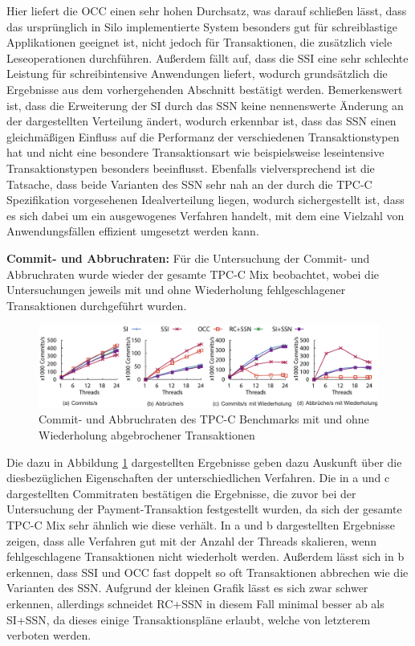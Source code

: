 Hier liefert die OCC einen sehr hohen Durchsatz, was darauf schließen lässt, dass das ursprünglich in Silo implementierte System besonders gut für schreiblastige Applikationen geeignet ist, nicht jedoch für Transaktionen, die zusätzlich viele Leseoperationen durchführen.
Außerdem fällt auf, dass die SSI eine sehr schlechte Leistung für schreibintensive Anwendungen liefert, wodurch grundsätzlich die Ergebnisse aus dem vorhergehenden Abschnitt bestätigt werden.
Bemerkenswert ist, dass die Erweiterung der SI durch das SSN keine nennenswerte Änderung an der dargestellten Verteilung ändert, wodurch erkennbar ist, dass das SSN einen gleichmäßigen Einfluss auf die Performanz der verschiedenen Transaktionstypen hat und nicht eine besondere Transaktionsart wie beispielsweise leseintensive Transaktionstypen besonders beeinflusst.
Ebenfalls vielversprechend ist die Tatsache, dass beide Varianten des SSN sehr nah an der durch die TPC-C Spezifikation vorgesehenen Idealverteilung liegen, wodurch sichergestellt ist, dass es sich dabei um ein ausgewogenes Verfahren handelt, mit dem eine Vielzahl von Anwendungsfällen effizient umgesetzt werden kann.

\textbf{Commit- und Abbruchraten:} Für die Untersuchung der Commit- und Abbruchraten wurde wieder der gesamte TPC-C Mix beobachtet, wobei die Untersuchungen jeweils mit und ohne Wiederholung fehlgeschlagener Transaktionen durchgeführt wurden.

\begin{figure}
	\includegraphics[width=\textwidth]{img/Figure_5_original.pdf}
	\caption{Commit- und Abbruchraten des TPC-C Benchmarks mit und ohne Wiederholung abgebrochener Transaktionen}
	\label{fig:commit_abort}
\end{figure}

Die dazu in Abbildung \ref{fig:commit_abort} dargestellten Ergebnisse geben dazu Auskunft über die diesbezüglichen Eigenschaften der unterschiedlichen Verfahren.
Die in a und c dargestellten Commitraten bestätigen die Ergebnisse, die zuvor bei der Untersuchung der Payment-Transaktion festgestellt wurden, da sich der gesamte TPC-C Mix sehr ähnlich wie diese verhält.
In a und b dargestellten Ergebnisse zeigen, dass alle Verfahren gut mit der Anzahl der Threads skalieren, wenn fehlgeschlagene Transaktionen nicht wiederholt werden.
Außerdem lässt sich in b erkennen, dass SSI und OCC fast doppelt so oft Transaktionen abbrechen wie die Varianten des SSN.
Aufgrund der kleinen Grafik lässt es sich zwar schwer erkennen, allerdings schneidet RC+SSN in diesem Fall minimal besser ab als SI+SSN, da dieses einige Transaktionspläne erlaubt, welche von letzterem verboten werden.

